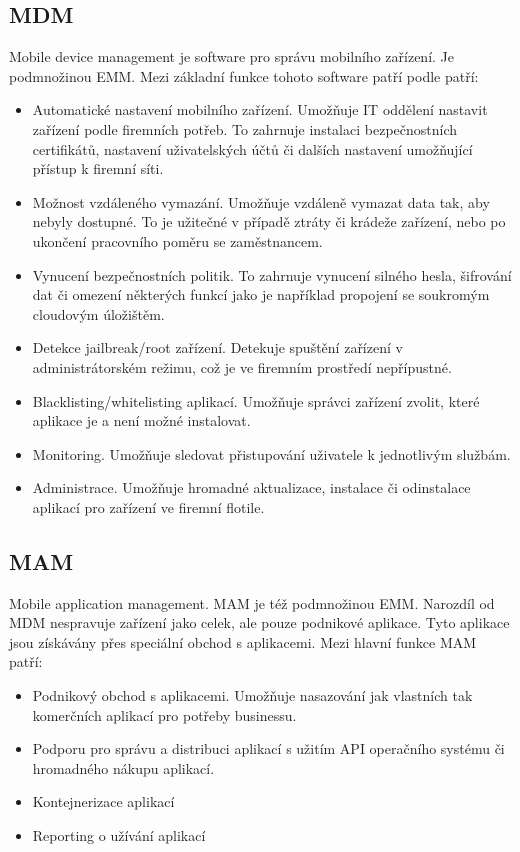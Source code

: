  
 
  \subsection{MDM}
 Mobile device management je software pro správu mobilního zařízení. Je podmnožinou EMM. Mezi základní funkce tohoto software patří podle  patří:
 \begin{itemize}
     \item Automatické nastavení mobilního zařízení. Umožňuje IT oddělení nastavit zařízení podle firemních potřeb. To zahrnuje instalaci bezpečnostních certifikátů, nastavení uživatelských účtů či dalších nastavení umožňující přístup k firemní síti.
     \item Možnost vzdáleného vymazání. Umožňuje vzdáleně vymazat data tak, aby nebyly dostupné. To je užitečné v případě ztráty či krádeže zařízení, nebo po ukončení pracovního poměru se zaměstnancem.
     \item Vynucení bezpečnostních politik. To zahrnuje vynucení silného hesla, šifrování dat či omezení některých funkcí jako je například propojení se soukromým cloudovým úložištěm. 
     \item Detekce jailbreak/root zařízení. Detekuje spuštění zařízení v administrátorském režimu, což je ve firemním prostředí nepřípustné.
     \item Blacklisting/whitelisting aplikací. Umožňuje správci zařízení zvolit, které aplikace je a není možné instalovat.
     \item Monitoring. Umožňuje sledovat přistupování uživatele k jednotlivým službám.
     \item Administrace. Umožňuje hromadné aktualizace, instalace či odinstalace aplikací pro zařízení ve firemní flotile.
 \end{itemize}
 
 
 \subsection{MAM} 
 Mobile application management. MAM je též podmnožinou EMM. Narozdíl od MDM nespravuje zařízení jako celek, ale pouze podnikové aplikace. Tyto aplikace jsou získávány přes speciální obchod s aplikacemi. Mezi hlavní funkce MAM patří:
 \begin{itemize}
     \item Podnikový obchod s aplikacemi. Umožňuje nasazování jak vlastních tak komerčních aplikací pro potřeby businessu.
     \item Podporu pro správu a distribuci aplikací s užitím API operačního systému či hromadného nákupu aplikací.
     \item Kontejnerizace aplikací
     \item Reporting o užívání aplikací
 \end{itemize}
 
